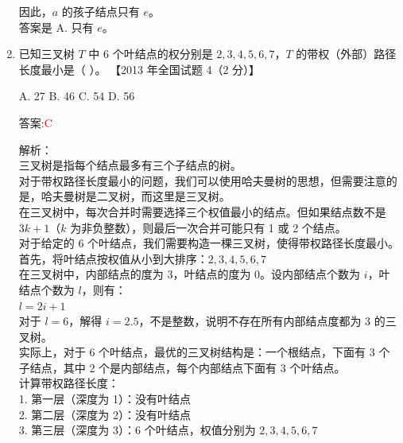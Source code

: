 \documentclass[lang=cn,newtx,10pt,scheme=chinese]{../../../elegantbook}
\begin{document}
\begin{enumerate}
        因此，$a$ 的孩子结点只有 $e$。\\
        
        答案是 A. 只有 $e$。\\
    
        \item 已知三叉树 $T$ 中 6 个叶结点的权分别是 $2, 3, 4, 5, 6, 7$，$T$ 的带权（外部）路径长度最小是（ ）。  
        【2013 年全国试题 4（2 分）】 
    
        A. 27 \quad B. 46 \quad C. 54 \quad D. 56  
    
        答案:\textcolor{red}{C}
        
        解析：\\
        三叉树是指每个结点最多有三个子结点的树。\\
        
        对于带权路径长度最小的问题，我们可以使用哈夫曼树的思想，但需要注意的是，哈夫曼树是二叉树，而这里是三叉树。\\
        
        在三叉树中，每次合并时需要选择三个权值最小的结点。但如果结点数不是 $3k+1$（$k$ 为非负整数），则最后一次合并可能只有 1 或 2 个结点。\\
        
        对于给定的 6 个叶结点，我们需要构造一棵三叉树，使得带权路径长度最小。\\
        
        首先，将叶结点按权值从小到大排序：$2, 3, 4, 5, 6, 7$\\
        
        在三叉树中，内部结点的度为 3，叶结点的度为 0。设内部结点个数为 $i$，叶结点个数为 $l$，则有：\\
        $l = 2i + 1$\\
        
        对于 $l = 6$，解得 $i = 2.5$，不是整数，说明不存在所有内部结点度都为 3 的三叉树。\\
        
        实际上，对于 6 个叶结点，最优的三叉树结构是：一个根结点，下面有 3 个子结点，其中 2 个是内部结点，每个内部结点下面有 3 个叶结点。\\
        
        计算带权路径长度：\\
        1. 第一层（深度为 1）：没有叶结点\\
        2. 第二层（深度为 2）：没有叶结点\\
        3. 第三层（深度为 3）：6 个叶结点，权值分别为 $2, 3, 4, 5, 6, 7$\\
        

\end{enumerate}
\end{document}
